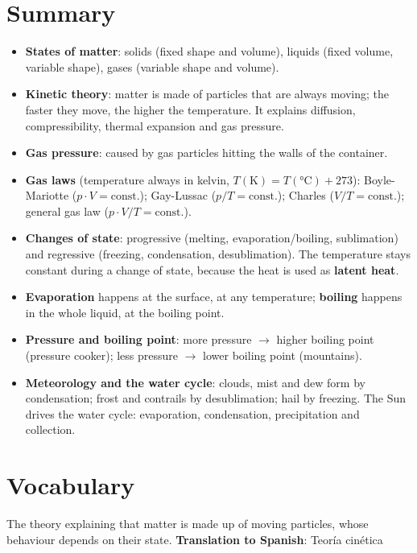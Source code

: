 
\section*{Summary}

\begin{itemize}
    \item \textbf{States of matter}: solids (fixed shape and volume), liquids (fixed volume, variable shape), gases (variable shape and volume).
    \item \textbf{Kinetic theory}: matter is made of particles that are always moving; the faster they move, the higher the temperature. It explains diffusion, compressibility, thermal expansion and gas pressure.
    \item \textbf{Gas pressure}: caused by gas particles hitting the walls of the container.
    \item \textbf{Gas laws} (temperature always in kelvin, \(T(\unit{\K}) = T(\unit{\celsius}) + 273\)): Boyle-Mariotte (\(p \cdot V = \text{const.}\)); Gay-Lussac (\(p/T = \text{const.}\)); Charles (\(V/T = \text{const.}\)); general gas law (\(p \cdot V / T = \text{const.}\)).
    \item \textbf{Changes of state}: progressive (melting, evaporation/boiling, sublimation) and regressive (freezing, condensation, desublimation). The temperature stays constant during a change of state, because the heat is used as \textbf{latent heat}.
    \item \textbf{Evaporation} happens at the surface, at any temperature; \textbf{boiling} happens in the whole liquid, at the boiling point.
    \item \textbf{Pressure and boiling point}: more pressure \(\to\) higher boiling point (pressure cooker); less pressure \(\to\) lower boiling point (mountains).
    \item \textbf{Meteorology and the water cycle}: clouds, mist and dew form by condensation; frost and contrails by desublimation; hail by freezing. The Sun drives the water cycle: evaporation, condensation, precipitation and collection.
\end{itemize}

\section{Vocabulary}

\begin{vocabulary}
    The theory explaining that matter is made up of moving particles, whose behaviour depends on their state. \newline
    \textbf{Translation to Spanish}: Teoría cinética
\end{vocabulary}

